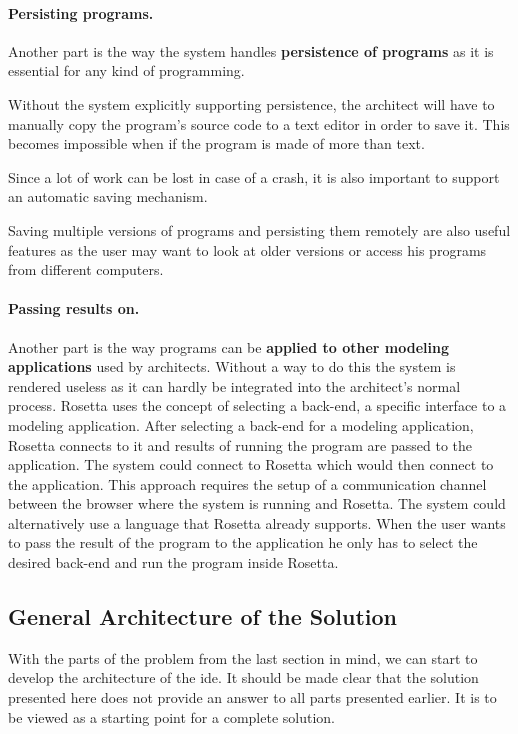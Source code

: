 \documentclass{./llncs2e/llncs}
\begin{document}
	\paragraph{Persisting programs.}
	Another part is the way the system handles \textbf{persistence of programs} as it is essential for any kind of programming.
	
	Without the system explicitly supporting persistence, the architect will have to manually copy the program's source code to a text editor in order to save it.
	This becomes impossible when if the program is made of more than text. 
	
	Since a lot of work can be lost in case of a crash, it is also important to support an automatic saving mechanism.

	Saving multiple versions of programs and persisting them remotely are also useful features as the user may want to look at older versions or access his programs from different computers.

	\paragraph{Passing results on.}
	Another part is the way programs can be \textbf{applied to other modeling applications} used by architects.
	Without a way to do this the system is rendered useless as it can hardly be integrated into the architect's normal process. 
	Rosetta uses the concept of selecting a back-end, a specific interface to a modeling application. 
	After selecting a back-end for a modeling application, Rosetta connects to it and results of running the program are passed to the application. 
	The system could connect to Rosetta which would then connect to the application. 
	This approach requires the setup of a communication channel between the browser where the system is running and Rosetta. 
	The system could alternatively use a language that Rosetta already supports. 
	When the user wants to pass the result of the program to the application he only has to select the desired back-end and run the program inside Rosetta.

\subsection{General Architecture of the Solution}
	With the parts of the problem from the last section in mind, we can start to develop the architecture of the \ac{ide}.
	It should be made clear that the solution presented here does not provide an answer to all parts presented earlier.
	It is to be viewed as a starting point for a complete solution.
	
\end{document}
